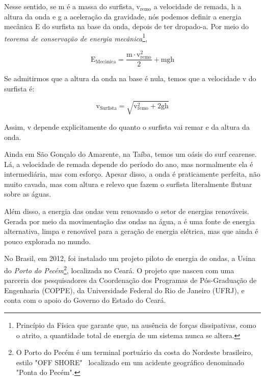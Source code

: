 \documentclass[book, 12pt, twoside, a5paper, english, brazil, sumario=tradicional, openany]{abntex2}
\begin{document}
Nesse sentido, se m é a massa do surfista, $\text{v}_{\text{remo}}$ a velocidade de remada, h a altura da onda e g a aceleração da gravidade, nós podemos definir a energia mecânica E do surfista na base da onda, depois de ter dropado-a. Por meio do \textit{teorema de conservação de energia mecânica}\footnote{Princípio da Física que garante que, na ausência de forças dissipativas, como o atrito, a quantidade total de energia de um sistema nunca se altera.}, 

\vspace{-0.2cm}

\begin{equation}
    \text{E}_{\text{Mecânica}} = \dfrac{\text{m} \cdot \text{v}_{\text{remo}}^{2}}{2} + \text{mgh}
\end{equation}

Se admitirmos que a altura da onda na base é nula, temos que a velocidade v do surfista é:

\vspace{-0.2cm}

\begin{equation}
    \text{v}_{\text{Surfista}} = \sqrt{\text{v}_\text{remo}^{2} + \text{2gh}}
\end{equation}

Assim, v depende explicitamente do quanto o surfista vai remar e da altura da onda.

Ainda em São Gonçalo do Amarente, na Taíba, temos um oásis do surf cearense. Lá, a velocidade de remada depende do período do ano, mas normalmente ela é intermediária, mas com esforço. Apesar disso, a onda é praticamente perfeita, não muito cavada, mas com altura e relevo que fazem o surfista literalmente flutuar sobre as águas. 

{}

\vspace{-0.3cm}

Além disso, a energia das ondas vem renovando o setor de energias renováveis. Gerada por meio da movimentação das ondas na água, a {\color{celestialblue}{energia ondomotriz}} é uma fonte de energia alternativa, limpa e renovável para a geração de energia elétrica, mas que ainda é pouco explorada no mundo.

No Brasil, em 2012, foi instalado um projeto piloto de energia de ondas, a Usina do \textit{Porto do Pecém}\footnote{O Porto do Pecém é um terminal portuário da costa do Nordeste brasileiro, estilo "OFF SHORE" \ localizado em um acidente geográfico denominado "Ponta do Pecém".}, localizada no Ceará. O projeto que nasceu com uma parceria dos pesquisadores da Coordenação dos Programas de Pós-Graduação de Engenharia (COPPE), da Universidade Federal do Rio de Janeiro (UFRJ), e conta com o apoio do Governo do Estado do Ceará.
\end{document}

